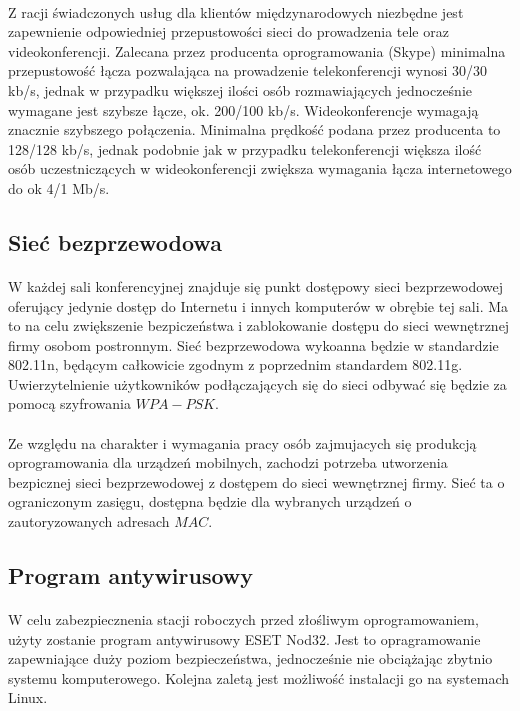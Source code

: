 \paragraph{}
Z racji świadczonych usług dla klientów międzynarodowych niezbędne jest zapewnienie odpowiedniej przepustowości sieci do prowadzenia tele oraz videokonferencji. Zalecana przez producenta oprogramowania (Skype) minimalna przepustowość łącza pozwalająca na prowadzenie telekonferencji wynosi 30/30 kb/s, jednak w przypadku większej ilości osób rozmawiających jednocześnie wymagane jest szybsze łącze, ok. 200/100 kb/s. Wideokonferencje wymagają znacznie szybszego połączenia. Minimalna prędkość podana przez producenta to 128/128 kb/s, jednak podobnie jak w przypadku telekonferencji większa ilość osób uczestniczących w wideokonferencji zwiększa wymagania łącza internetowego do ok 4/1 Mb/s.
\subsection{Sieć bezprzewodowa}
\paragraph{}
W każdej sali konferencyjnej znajduje się punkt dostępowy sieci bezprzewodowej  oferujący jedynie dostęp do Internetu i innych komputerów w obrębie tej sali. Ma to na celu zwiększenie bezpiczeństwa i zablokowanie dostępu do sieci wewnętrznej firmy osobom postronnym. Sieć bezprzewodowa wykoanna będzie w standardzie 802.11n, będącym całkowicie zgodnym z poprzednim standardem 802.11g. Uwierzytelnienie użytkowników podłączających się do sieci odbywać się będzie za pomocą szyfrowania $WPA-PSK$.
\paragraph{}
Ze względu na charakter i wymagania pracy osób zajmujacych się produkcją oprogramowania dla urządzeń mobilnych, zachodzi potrzeba utworzenia bezpicznej sieci bezprzewodowej z dostępem do sieci wewnętrznej firmy. Sieć ta o ograniczonym zasięgu, dostępna będzie dla wybranych urządzeń o zautoryzowanych adresach $MAC$.

\subsection{Program antywirusowy}
\paragraph{}
W celu zabezpiecznenia stacji roboczych przed złośliwym oprogramowaniem, użyty zostanie program antywirusowy ESET Nod32. Jest to opragramowanie zapewniające duży poziom bezpieczeństwa, jednocześnie nie obciążając zbytnio systemu komputerowego. Kolejna zaletą jest możliwość instalacji go na systemach Linux.

